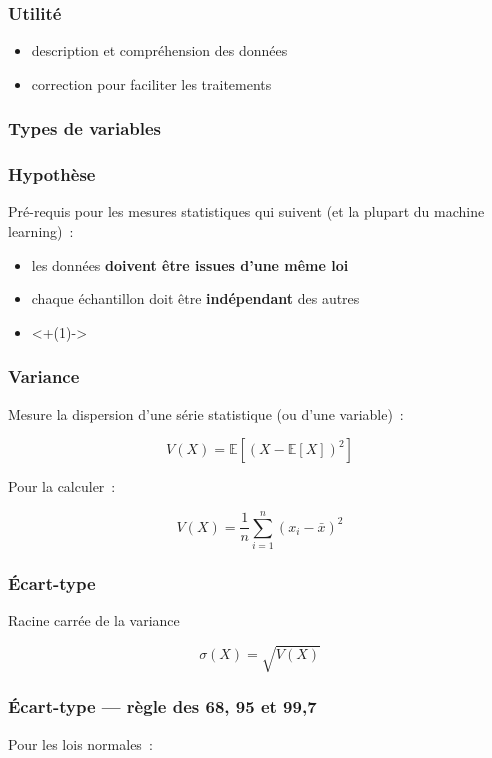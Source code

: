 
\begin{frame}
  \frametitle{Utilité}
  \begin{itemize}
  \item description et compréhension des données
  \item correction pour faciliter les traitements
  \end{itemize}
\end{frame}

\begin{frame}
  \frametitle{Types de variables}
\end{frame}

\begin{frame}
  \frametitle{Hypothèse}

  Pré-requis pour les mesures statistiques qui suivent (et la plupart
  du machine learning) :
  \begin{itemize}
  \item les données \textbf{doivent être issues d'une même loi}
  \item chaque échantillon doit être \textbf{indépendant} des autres
  \item {} \visible<+(1)->{}
  \end{itemize}
\end{frame}

\begin{frame}[fragile]
  \frametitle{Variance}
  Mesure la dispersion d'une série statistique (ou d'une variable) :

  \[
    V(X) = \mathbb{E}\left[(X - \mathbb{E}[X])^2\right]
  \]

  Pour la calculer :

  \[
    V(X) = \frac{1}{n}\sum_{i = 1}^{n}(x_i - \bar{x})^2
  \]
\end{frame}

\begin{frame}[fragile]
  \frametitle{Écart-type}
  Racine carrée de la variance

  \[
    \sigma(X) = \sqrt{V(X)}
  \]

\end{frame}

\begin{frame}[fragile]
  \frametitle{Écart-type — règle des 68, 95 et 99,7}

  Pour les lois normales :

\end{frame}

